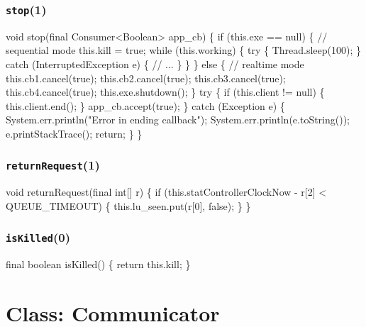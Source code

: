 \subsection{\texttt{stop}(1)}
\nwenddocs{}\endmoddef{}
void stop(final Consumer<Boolean> app_cb) \{
  if (this.exe == null) \{  // sequential mode
    this.kill = true;
    while (this.working) \{
      try \{
        Thread.sleep(100);
      \} catch (InterruptedException e) \{
        // ...
      \}
    \}
  \} else \{  // realtime mode
    this.cb1.cancel(true);
    this.cb2.cancel(true);
    this.cb3.cancel(true);
    this.cb4.cancel(true);
    this.exe.shutdown();
  \}
  try \{
    if (this.client != null) \{
      this.client.end();
    \}
    app_cb.accept(true);
  \} catch (Exception e) \{
    System.err.println("Error in ending callback");
    System.err.println(e.toString());
    e.printStackTrace();
    return;
  \}
\}
\eatline
{}\nwendcode{}\nwdocspar
\subsection{\texttt{returnRequest}(1)}
\nwenddocs{}\endmoddef{}
void returnRequest(final int[] r) \{
  if (this.statControllerClockNow - r[2] < QUEUE_TIMEOUT) \{
    this.lu_seen.put(r[0], false);
  \}
\}
\eatline
{}\nwendcode{}\nwdocspar
\subsection{\texttt{isKilled}(0)}
\nwenddocs{}\endmoddef{}
final boolean isKilled() \{
  return this.kill;
\}
\eatline
{}\nwendcode{}\nwdocspar
\nwenddocs{}\chapter{Class: Communicator}
\label{communicator}

